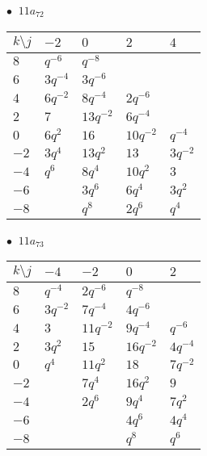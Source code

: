 \begin{minipage}{\linewidth}
$\bullet\ $ $11a_{72}$ \vspace{0.5em} \\
\begin{tabular}{l|llll}
$k \setminus j$ & $-2$ & $0$ & $2$ & $4$ \\
\hline
$8$ & $q^{-6}$ & $q^{-8}$ &  &  \\
$6$ & $3q^{-4}$ & $3q^{-6}$ &  &  \\
$4$ & $6q^{-2}$ & $8q^{-4}$ & $2q^{-6}$ &  \\
$2$ & $7$ & $13q^{-2}$ & $6q^{-4}$ &  \\
$0$ & $6q^{2}$ & $16$ & $10q^{-2}$ & $q^{-4}$ \\
$-2$ & $3q^{4}$ & $13q^{2}$ & $13$ & $3q^{-2}$ \\
$-4$ & $q^{6}$ & $8q^{4}$ & $10q^{2}$ & $3$ \\
$-6$ &  & $3q^{6}$ & $6q^{4}$ & $3q^{2}$ \\
$-8$ &  & $q^{8}$ & $2q^{6}$ & $q^{4}$ \\
\end{tabular}
\vspace{2em}
\end{minipage}
%
\begin{minipage}{\linewidth}
$\bullet\ $ $11a_{73}$ \vspace{0.5em} \\
\begin{tabular}{l|llll}
$k \setminus j$ & $-4$ & $-2$ & $0$ & $2$ \\
\hline
$8$ & $q^{-4}$ & $2q^{-6}$ & $q^{-8}$ &  \\
$6$ & $3q^{-2}$ & $7q^{-4}$ & $4q^{-6}$ &  \\
$4$ & $3$ & $11q^{-2}$ & $9q^{-4}$ & $q^{-6}$ \\
$2$ & $3q^{2}$ & $15$ & $16q^{-2}$ & $4q^{-4}$ \\
$0$ & $q^{4}$ & $11q^{2}$ & $18$ & $7q^{-2}$ \\
$-2$ &  & $7q^{4}$ & $16q^{2}$ & $9$ \\
$-4$ &  & $2q^{6}$ & $9q^{4}$ & $7q^{2}$ \\
$-6$ &  &  & $4q^{6}$ & $4q^{4}$ \\
$-8$ &  &  & $q^{8}$ & $q^{6}$ \\
\end{tabular}
\vspace{2em}
\end{minipage}
%
